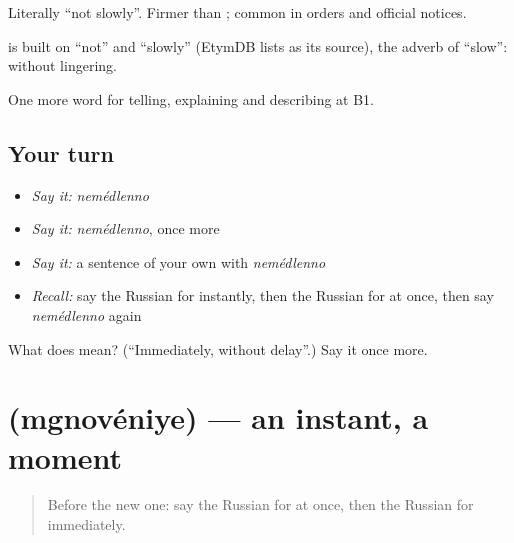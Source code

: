 Literally \textquotedblleft{}not slowly\textquotedblright{}. Firmer than \emph{}; common in orders and official notices.

\begin{cousinweb}
\emph{} is built on \emph{} \textquotedblleft{}not\textquotedblright{} and \emph{} \textquotedblleft{}slowly\textquotedblright{} (EtymDB lists \emph{} as its source), the adverb of \emph{} \textquotedblleft{}slow\textquotedblright{}: without lingering.
\end{cousinweb}

\begin{grammarlens}[title={What you've built}]
One more word for telling, explaining and describing at B1.
\end{grammarlens}

\subsection*{Your turn}
\begin{itemize}
\raggedright
  \item \emph{Say it:} \emph{nemédlenno}
  \item \emph{Say it:} \emph{nemédlenno}, once more
  \item \emph{Say it:} a sentence of your own with \emph{nemédlenno}
  \item \emph{Recall:} say the Russian for instantly, then the Russian for at once, then say \emph{nemédlenno} again
\end{itemize}

\begin{tcolorbox}[breakable,colback=teal!4,colframe=teal!35!black,title={Before you move on}]
What does  mean? (\textquotedblleft{}Immediately, without delay\textquotedblright{}.) Say it once more.
\end{tcolorbox}
\section[\texorpdfstring{\ru{мгновение} (mgnovéniye)}{мгновение (mgnovéniye)}]{ (mgnovéniye) — an instant, a moment}

\label{lesson:RU-C271-mgnovenie}



\begin{quote}
Before the new one: say the Russian for at once, then the Russian for immediately.
\end{quote}

